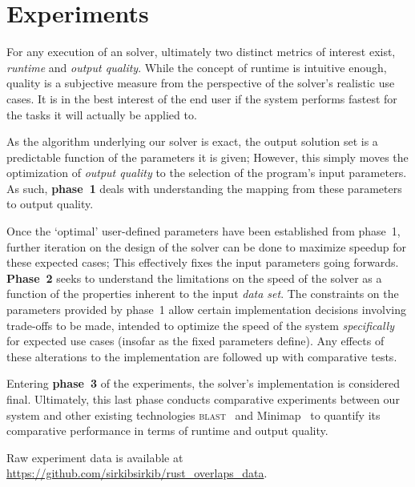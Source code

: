 \chapter{Experiments}

For any execution of an \aspop{} solver, ultimately two distinct metrics of interest exist, \textit{runtime} and \textit{output quality}. While the concept of runtime is intuitive enough, quality is a subjective measure from the perspective of the solver's realistic use cases. It is in the best interest of the end user if the system performs fastest for the tasks it will actually be applied to. 

As the algorithm underlying our \aspop{} solver is exact, the output \gls{solution} set is a predictable function of the parameters it is given; However, this simply moves the optimization of \textit{output quality} to the selection of the program's input parameters. As such, \textbf{phase~1} deals with understanding the mapping from these parameters to output quality.
 
Once the `optimal' user-defined parameters have been established from phase~1, further iteration on the design of the solver can be done to maximize speedup for these expected cases; This effectively fixes the input parameters going forwards. \textbf{Phase~2} seeks to understand the limitations on the speed of the solver as a function of the properties inherent to the input \textit{data set}. The constraints on the parameters provided by phase~1 allow certain implementation decisions involving trade-offs to be made, intended to optimize the speed of the system \textit{specifically} for expected use cases (insofar as the fixed parameters define). Any effects of these alterations to the implementation are followed up with comparative tests.
 
Entering \textbf{phase~3} of the experiments, the \aspop{} solver's implementation is considered final. Ultimately, this last phase conducts comparative experiments between our system and other existing technologies \textsc{blast}~\cite{blast} and Minimap~\cite{minimap} to quantify its comparative performance in terms of runtime and output quality.

Raw experiment data is available at \url{https://github.com/sirkibsirkib/rust_overlaps_data}.




